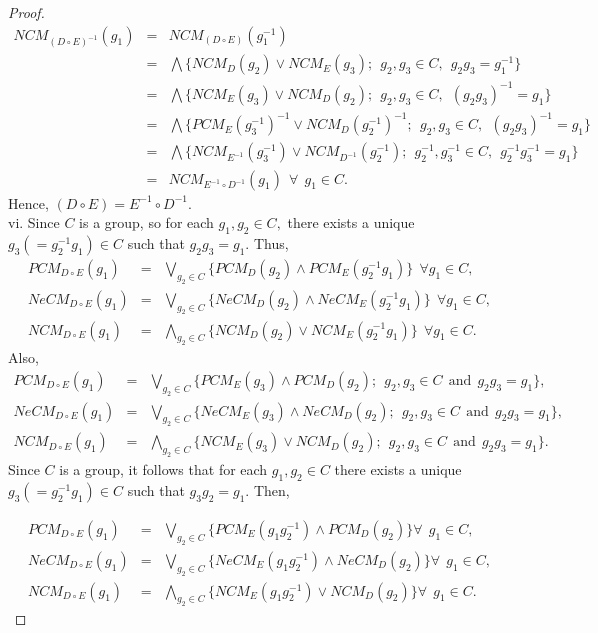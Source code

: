 \documentclass[10pt,a4paper]{amsart}
\newcommand{\dis}{\displaystyle}
\begin{document}
\begin{proof}
\begin{eqnarray*}
NCM_{ (D \circ E)^{-1}}(g_1) & = & NCM_{ (D \circ E)}(g^{-1}_1)\\
& = & \bigwedge \lbrace  NCM_{D}(g_2) \vee NCM_{E}(g_3);~~ g_2, g_3 \in C,~~ g_2g_3 = g_1^{-1} \rbrace \\
& = & \bigwedge \lbrace  NCM_{E}(g_3) \vee NCM_{D}(g_2);~~ g_2, g_3 \in C,~~ (g_2g_3)^{-1} = g_1 \rbrace\\
& = & \bigwedge \lbrace  PCM_{E}(g^{-1}_3)^{-1} \vee NCM_{D}(g^{-1}_2)^{-1};~~ g_2, g_3 \in C,~~ (g_2g_3)^{-1} = g_1 \rbrace\\
& = & \bigwedge \lbrace  NCM_{E^{-1}}(g^{-1}_3) \vee NCM_{D^{-1}}(g^{-1}_2);~~ g^{-1}_2, g^{-1}_3 \in C,~~ g^{-1}_2g^{-1}_3 = g_1 \rbrace\\
& = & NCM_{E^{-1} \circ D^{-1}}(g_1)~~ \forall~~ g_1 \in C.
\end{eqnarray*}
Hence, $(D \circ E) = E^{-1} \circ D^{-1}.$\\

vi. Since $C$ is a group, so for each $g_1, g_2 \in C,$ there exists a unique $g_3 (= g^{-1}_2 g_1) \in C$ such that $g_2 g_3 = g_1.$ Thus, 
\begin{eqnarray*}
PCM_{D \circ E}(g_1) & = & \dis \bigvee_{g_2 \in C} \lbrace  PCM_{D}(g_2) \wedge PCM_{E}(g^{-1}_2 g_1) \rbrace~~ \forall g_1 \in C, \\
NeCM_{D \circ E}(g_1) & = & \dis \bigvee_{g_2 \in C} \lbrace  NeCM_{D}(g_2) \wedge NeCM_{E}(g^{-1}_2 g_1) \rbrace~~ \forall g_1 \in C, \\ 
NCM_{D \circ E}(g_1) & = & \dis \bigwedge_{g_2 \in C} \lbrace  NCM_{D}(g_2) \vee NCM_{E}(g^{-1}_2 g_1) \rbrace~~ \forall g_1 \in C.
\end{eqnarray*}
Also,
\begin{eqnarray*}
PCM_{D \circ E}(g_1) & = & \dis \bigvee_{g_2 \in C} \lbrace  PCM_{E}(g_3) \wedge PCM_{D}(g_2);~~ g_2, g_3 \in C ~~\text{and}~~ g_2 g_3 = g_1 \rbrace, \\
NeCM_{D \circ E}(g_1) & = & \dis \bigvee_{g_2 \in C} \lbrace  NeCM_{E}(g_3) \wedge NeCM_{D}(g_2);~~ g_2, g_3 \in C ~~\text{and}~~ g_2 g_3 = g_1 \rbrace, \\ 
NCM_{D \circ E}(g_1) & = & \dis \bigwedge_{g_2 \in C} \lbrace  NCM_{E}(g_3) \vee NCM_{D}(g_2);~~ g_2, g_3 \in C ~~\text{and}~~ g_2 g_3 = g_1 \rbrace.
\end{eqnarray*}
Since $C$ is a group, it follows that for each $g_1, g_2 \in C$ there exists a unique $g_3 (= g^{-1}_2 g_1) \in C$ such that $g_3 g_2 = g_1.$ Then, 

\begin{eqnarray*}
PCM_{D \circ E}(g_1) & = & \dis \bigvee_{g_2 \in C} \lbrace  PCM_{E}(g_1g_2^{-1}) \wedge PCM_{D}(g_2) \rbrace \forall~~ g_1 \in C, \\
NeCM_{D \circ E}(g_1) & = & \dis \bigvee_{g_2 \in C} \lbrace  NeCM_{E}(g_1g_2^{-1}) \wedge NeCM_{D}(g_2) \rbrace \forall~~ g_1 \in C,\\ 
NCM_{D \circ E}(g_1) & = & \dis \bigwedge_{g_2 \in C} \lbrace  NCM_{E}(g_1g_2^{-1}) \vee NCM_{D}(g_2) \rbrace \forall~~ g_1 \in C.
\end{eqnarray*}
\end{proof}
\end{document}
